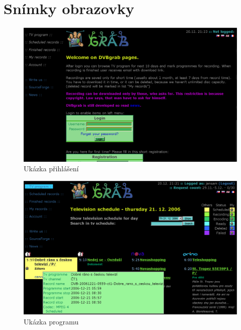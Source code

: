 \documentclass[11pt,twoside,a4paper]{dp_format}%
\begin{document}
\chapter{Snímky obrazovky}
\begin{figure}[ht]
\begin{center}
\includegraphics[width=12cm]{images/scrPrihlaseni.eps}
\caption{Ukázka přihlášení}
\label{fig:dvbgrab}
\end{center}
\end{figure}

\nopagebreak 

\begin{figure}[ht]
\begin{center}
\includegraphics[width=12cm]{images/scrProgram.eps}
\caption{Ukázka programu}
\label{fig:dvbgrab}
\end{center}
\end{figure}

\pagebreak
\end{document}
